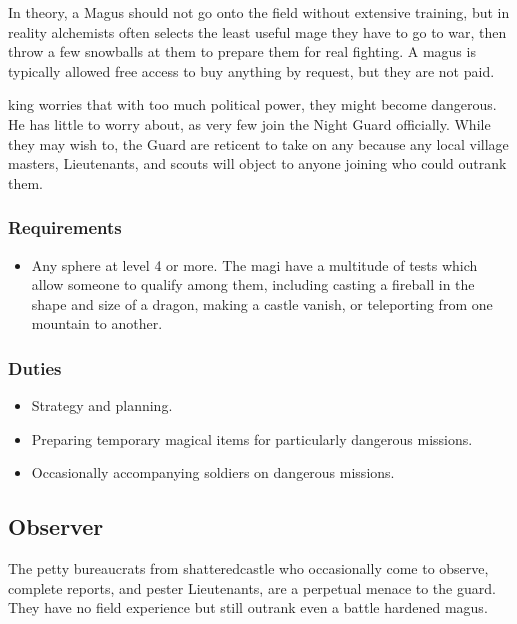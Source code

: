 \begin{multicols}{2}
In theory, a Magus should not go onto the field without extensive training, but in reality \gls{alchemists} often selects the least useful mage they have to go to war, then throw a few snowballs at them to prepare them for real fighting.
A magus is typically allowed free access to buy anything by request, but they are not paid.

\Gls{king} worries that with too much political power, they might become dangerous.
He has little to worry about, as very few join the Night Guard officially.
While they may wish to, the Guard are reticent to take on any because any local village masters, Lieutenants, and scouts will object to anyone joining who could outrank them.

\subsubsection{Requirements}

\begin{itemize}
  \item
  Any sphere at level 4 or more.
  The magi have a multitude of tests which allow someone to qualify among them, including casting a fireball in the shape and size of a dragon, making a castle vanish, or teleporting from one mountain to another.
\end{itemize}

\subsubsection{Duties}

\begin{itemize}
  \item
  Strategy and planning.
  \item
  Preparing temporary magical items for particularly dangerous missions.
  \item
  Occasionally accompanying soldiers on dangerous missions.
\end{itemize}

\subsection{Observer}

The petty bureaucrats from \gls{shatteredcastle} who occasionally come to observe, complete reports, and pester Lieutenants, are a perpetual menace to the \gls{guard}.
They have no field experience but still outrank even a battle hardened magus.


\end{multicols}
